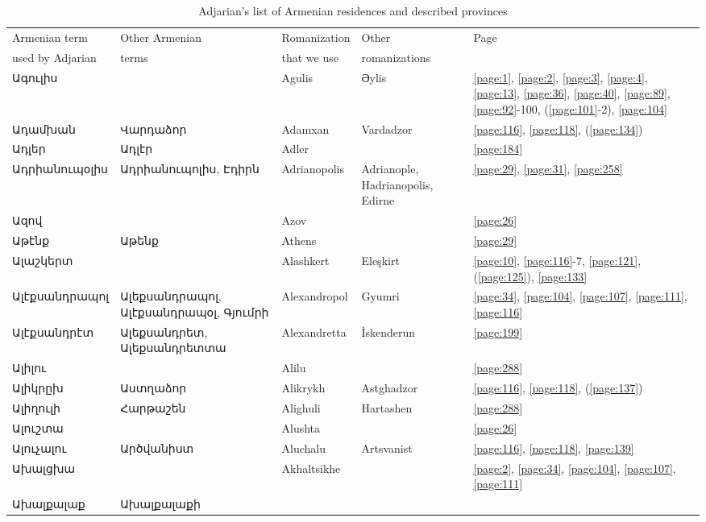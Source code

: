 \begin{center}
\begin{longtable}{|p{}|p{3cm}|p{3cm}|p{2cm}|p{3cm}|}
\caption{Adjarian's  list of Armenian residences and described provinces} \label{tab:long} \\ \hline
\hline Armenian term & Other Armenian  & Romanization   & Other   & Page \\ 
used by Adjarian  & terms&   that we use&romanizations & 
\\ \hline\hline
Ագուլիս & & 
{Agulis}   &Əylis &\ref{page:1}, \ref{page:2}, \ref{page:3}, \ref{page:4}, \ref{page:13}, \ref{page:36}, \ref{page:40}, \ref{page:89}, \ref{page:92}-100, (\ref{page:101}-2), \ref{page:104}\\ \hline
Ադամխան&  Վարդաձոր & 
{Adamxan} & Vardadzor
&\ref{page:116}, \ref{page:118}, (\ref{page:134})\\ \hline
Ադլեր&Ադլէր & 
{Adler}& &\ref{page:184}\\ \hline
Ադրիանուպօլիս&Ադրիանուպոլիս, Էդիրն
& {Adrianopolis}  & Adrianople,  Hadrianopolis, Edirne &\ref{page:29}, \ref{page:31}, \ref{page:258}\\ \hline
Ազով& &
{Azov}& &\ref{page:26}\\ \hline
Աթէնք& Աթենք&
{Athens}& &\ref{page:29}\\ \hline
Ալաշկերտ& &
{Alashkert}& Eleşkirt&\ref{page:10}, \ref{page:116}-7, \ref{page:121}, (\ref{page:125}), \ref{page:133}\\ \hline
Ալէքսանդրապոլ&Ալեքսանդրապոլ,  Ալէքսանդրապօլ,  Գյումրի
&{Alexandropol} & Gyumri&\ref{page:34}, \ref{page:104}, \ref{page:107}, \ref{page:111}, \ref{page:116}\\ \hline
Ալէքսանդրէտ&Ալեքսանդրետ, Ալեքսանդրետտա &
{Alexandretta}& İskenderun&\ref{page:199}\\ \hline
Ալիլու& 
&{Alilu}& &\ref{page:288}\\ \hline
Ալիկրըխ&Աստղաձոր &
{Alikrykh}&Astghadzor &\ref{page:116}, \ref{page:118}, (\ref{page:137})\\ \hline
Ալիղուլի& Հարթաշեն
& {Alighuli}& Hartashen&\ref{page:288}\\ \hline
Ալուշտա& &
{Alushta}& &\ref{page:26}\\ \hline
Ալուչալու&    Արծվանիստ 
&{Aluchalu} &Artsvanist &\ref{page:116}, \ref{page:118}, \ref{page:139}\\ \hline
Ախալցխա& 
&{Akhaltsikhe} & &\ref{page:2}, \ref{page:34}, \ref{page:104}, \ref{page:107}, \ref{page:111}\\ \hline
Ախալքալաք&Ախալքալաքի & 

\end{longtable}
\end{center}
